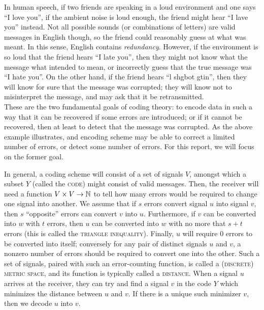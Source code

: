 \documentclass{report}
\begin{document}
    In human speech, if two friends are speaking in a loud environment and one
    says ``I love you'', if the ambient noise is loud enough, the friend might
    hear ``I lave you'' instead.  Not all possible sounds (or combinations of
    letters) are valid messages in English though, so the friend could
    reasonably guess at what was meant.  In this sense, English contains
    \textit{redundancy}.  However, if the environment is so loud that the friend
    hears ``I late you'', then they might not know what the message what
    intended to mean, or incorrectly guess that the true message was ``I hate
    you''.  On the other hand, if the friend hears ``l shgbot gtin'', then they
    will know for sure that the message was corrupted; they will know not to
    misinterpret the message, and may ask that it be retransmitted.
    \\

    These are the two fundamental goals of coding theory: to encode data in such
    a way that it can be recovered if some errors are introduced; or if it
    cannot be recovered, then at least to detect that the message was corrupted.
    As the above example illustrates, and encoding scheme may be able to correct
    a limited number of errors, or detect some number of errors.  For this
    report, we will focus on the former goal.

    In general, a coding scheme will consist of a set of signals $V$, amongst
    which a subset $Y$ (called the \textsc{code}) might consist of valid
    messages.  Then, the receiver will need a function $V \times V \to \mathbb{N}$ to
    tell how many errors would be required to change one signal into another.
    We assume that if $s$ errors convert signal $u$ into signal $v$, then $s$
    ``opposite'' errors can convert $v$ into $u$.  Furthermore, if $v$ can be
    converted into $w$ with $t$ errors, then $u$ can be converted into $w$ with
    no more that $s + t$ errors (this is called the \textsc{triangle
    inequality}).  Finally, $u$ will require $0$ errors to be converted into
    itself; conversely for any pair of distinct signals $u$ and $v$, a nonzero
    number of errors should be required to convert one into the other.  Such a
    set of signals, paired with such an error-counting function, is called a
    \textsc{(discrete) metric space}, and its function is typically called a
    \textsc{distance}.  When a signal $u$ arrives at the receiver, they can try
    and find a signal $v$ in the code $Y$ which minimizes the distance between
    $u$ and $v$.  If there is a unique such minimizer $v$, then we decode $u$
    into $v$.
\end{document}
